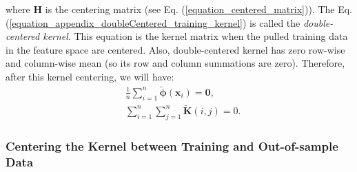 \documentclass[lang=cn,10pt]{gorgeousnbook}
\numberwithin{equation}{section}%
\numberwithin{figure}{section}%
\begin{document}
where $\boldsymbol{H}$ is the centering matrix (see Eq. (\ref{equation_centered_matrix})).
The Eq. (\ref{equation_appendix_doubleCentered_training_kernel}) is called the \textit{double-centered kernel}. 
This equation is the kernel matrix when the pulled training data in the feature space are centered. Also, double-centered kernel has zero row-wise and column-wise mean (so its row and column summations are zero). 
Therefore, after this kernel centering, we will have:
\begin{align}
&\frac{1}{n} \sum_{i=1}^n \breve{\boldsymbol{\phi}}(\boldsymbol{x}_i) = \boldsymbol{0}, \\
&\sum_{i=1}^n \sum_{j=1}^n \breve{\boldsymbol{K}}(i,j) = 0. \label{equation_appendix_doubleCentered_training_kernel_sum}
\end{align}

\subsubsection{Centering the Kernel between Training and Out-of-sample Data}
\end{document}
